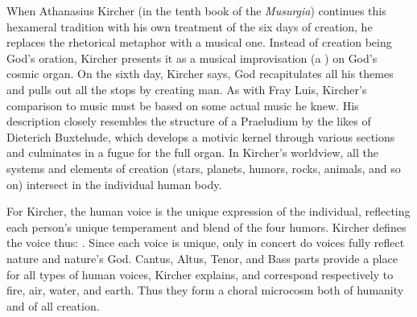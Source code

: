 When Athanasius Kircher (in the tenth book of the \emph{Musurgia}) continues
this hexameral tradition with his own treatment of the six days of creation, he
replaces the rhetorical metaphor with a musical one.
Instead of creation being God's oration, Kircher presents it as a musical
improvisation (a ) on God's cosmic organ.%
    \Autocite[, 366--367]{Kircher:Musurgia}
On the sixth day, Kircher says, God recapitulates all his themes and pulls out
all the stops by creating man.
As with Fray Luis, Kircher's comparison to music must be based on some actual
music he knew. 
His description closely resembles the structure of a Praeludium by the
likes of Dieterich Buxtehude, which develops a motivic kernel through various
sections and culminates in a fugue for the full organ.
In Kircher's worldview, all the systems and elements of creation (stars,
planets, humors, rocks, animals, and so on) intersect in the individual human
body.%
    \Autocite[, 402]{Kircher:Musurgia}


For Kircher, the human voice is the unique expression of the individual,
reflecting each person's unique temperament and blend of the four humors.%
    \Autocite[, 23--24]{Kircher:Musurgia}
Kircher defines the voice thus: .%
    \Autocite[, 20]{Kircher:Musurgia}
Since each voice is unique, only in concert do voices fully reflect nature and
nature's God.
Cantus, Altus, Tenor, and Bass parts provide a place for all types of human
voices, Kircher explains, and correspond respectively to fire, air, water, and
earth.
Thus they form a choral microcosm both of humanity and of all creation.%
    \Autocite[, 217--219]{Kircher:Musurgia}


